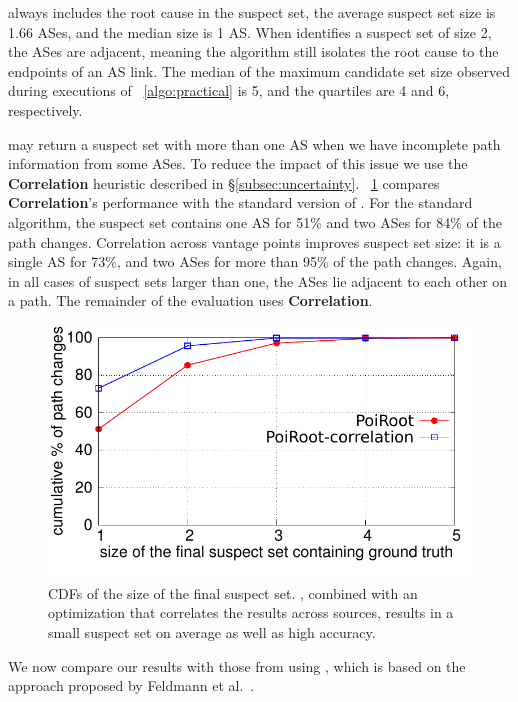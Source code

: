 \ouralgo always includes the root cause in the suspect set, 
the average suspect set size is 1.66 ASes, and the median size is 1
AS.  When \ouralgo identifies a suspect set of size 2, the ASes are
adjacent, meaning the algorithm still isolates the root cause to the
endpoints of an AS link. The median of the maximum candidate set size
observed during executions of \algstr~\ref{algo:practical} is 5, and
the quartiles are 4 and 6, respectively. 

\ouralgo may return a suspect set with more than one AS when we
have incomplete path information from some ASes. To reduce the impact of
this issue we use the \textbf{Correlation} heuristic described in
\S\ref{subsec:uncertainty}. \fig~\ref{fig:main} compares
\textbf{Correlation}'s  performance with the standard version of \ouralgo. 
For the standard algorithm, the suspect set contains one AS
for 51\% and two ASes for 84\% of the path changes.  Correlation across
vantage points improves suspect set size: it is a single AS for 73\%, and 
two ASes for more than 95\% of the path changes.  Again, in all cases of
suspect sets larger than one, the ASes lie adjacent to each other on a
path.  The remainder of the evaluation 
uses \textbf{Correlation}.

\begin{figure}[tbp]
\centering
\includegraphics[width=\columnwidth]{figs/main.pdf} 
\vspace{-2em}
\caption{CDFs of the size of the final suspect set. \ouralgo, combined with an optimization that correlates the results across sources, results in a small suspect set on average as well as high accuracy.} 
\label{fig:main} 
\vspace{1em}
\end{figure}

We now compare our results with those from using \feldmann, which is based on the approach proposed by 
Feldmann et al.~\cite{feldman}.


